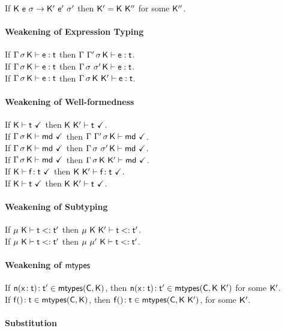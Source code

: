 \documentclass[acmlarge, anonymous, authordraft]{acmart}
\begin{document}
If ${{\sf{K}}}~{{\sf{e}}}~{\sigma} \rightarrow {{\ensuremath{{\sf{K'}}}}}~{{{{\sf{e'}}}}}~{{{\sigma'}}}$ then ${{\sf{K'}}} = {\sf{K}}~{{\sf{K''}}}$ for some ${{\sf{K''}}}$.

\paragraph{Weakening of Expression Typing}

If $\EnvType\Env\s\K\e\t$ then $\EnvType{\Env~\Envp}\s\K\e\t$. \\ 
If $\EnvType\Env\s\K\e\t$ then $\EnvType\Env{\s~\s'}\K\e\t$. \\ 
If $\EnvType\Env\s\K\e\t$ then $\EnvType\Env\s{\K~\Kp}\e\t$. \\ 

\paragraph{Weakening of Well-formedness}

If $\WFtype\K\t$ then $\WFtype{\K~\Kp}\t$. \\
If $\Gamma\,\sigma\,{\sf{K}}\vdash{\sf{md}} ~\checkmark$ then $\Gamma~\Gamma'\,\sigma\,{\sf{K}}\vdash{\sf{md}} ~\checkmark$.\\
If $\Gamma\,\sigma\,{\sf{K}}\vdash{\sf{md}} ~\checkmark$ then $\Gamma\,\sigma~\sigma'\,{\sf{K}}\vdash{\sf{md}} ~\checkmark$.\\
If $\Gamma\,\sigma\,{\sf{K}}\vdash{\sf{md}} ~\checkmark$ then $\Gamma\,\sigma\,{\sf{K}}~{{\sf{K'}}}\vdash{\sf{md}} ~\checkmark$.\\
If $\WFtype\K{\Fdef\f\t}$ then $\WFtype{\K~\Kp}{\Fdef\f\t}$.\\
If $\WFtype\K\t$ then $\WFtype{\K~\Kp}\t$.\\

\paragraph{Weakening of Subtyping}

If $\StrSub\M{\K}\t\tp$ then $\StrSub\M{\K~\Kp}\t\tp$. \\
If $\StrSub{\M}{\K}\t\tp$ then $\StrSub{\M~\M'}{\K}\t\tp$.

\paragraph{Weakening of ${\sf{mtypes}}$}

If $\Mtype\n{\HT\x\t}\tp \in \classoff{\C}{\K}$, then $\Mtype\n{\HT\x\t}\tp \in \classoff{\C}{\K~\Kp}$ for some ${{\sf{K'}}}$.\\
If $\Mtype\f{}\t \in \classoff\C\K$, then $\Mtype\f{}\t \in \classoff\C{\K~\Kp}$, for some ${{\sf{K'}}}$.

\paragraph{Substitution}
\end{document}

